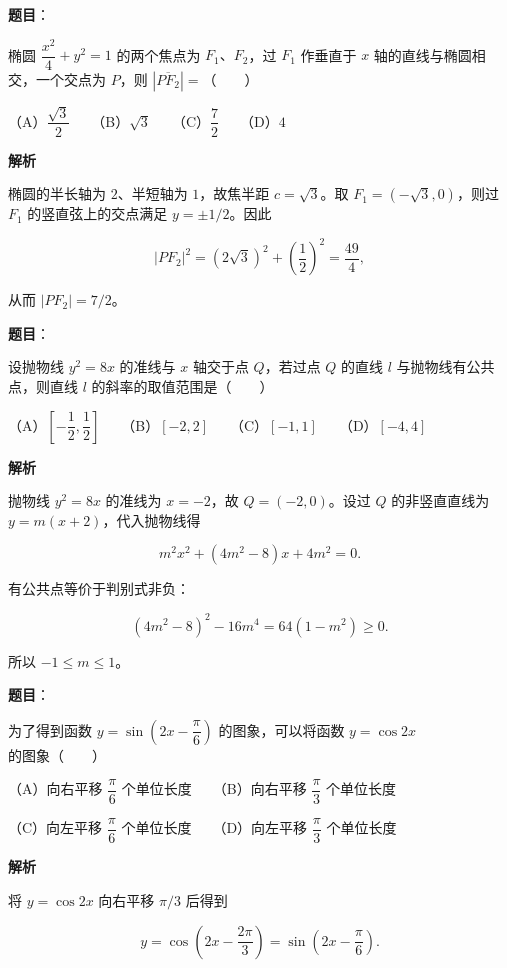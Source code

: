 \begin{answer}

\textbf{题目}：

椭圆 $\dfrac{x^2}{4}+y^2=1$ 的两个焦点为 $F_1\text{、}F_2$，过 $F_1$ 作垂直于 $x$ 轴的直线与椭圆相交，一个交点为 $P$，则 $|\overline{PF_2}|=$\mbox{（　　）}

（A）$\dfrac{\sqrt3}{2}$　　（B）$\sqrt3$　　（C）$\dfrac72$　　（D）$4$

\textbf{解析}

椭圆的半长轴为 $2$、半短轴为 $1$，故焦半距 $c=\sqrt3$。取 $F_1=(-\sqrt3,0)$，则过 $F_1$ 的竖直弦上的交点满足 $y=\pm1/2$。因此

\nopagebreak[4]
\[
|PF_2|^2=(2\sqrt3)^2+\left(\frac12\right)^2=\frac{49}{4},
\]

从而 $|PF_2|=7/2$。


\end{answer}
\begin{answer}

\textbf{题目}：

设抛物线 $y^2=8x$ 的准线与 $x$ 轴交于点 $Q$，若过点 $Q$ 的直线 $l$ 与抛物线有公共点，则直线 $l$ 的斜率的取值范围是\mbox{（　　）}

（A）$\left[-\dfrac12,\dfrac12\right]$　　（B）$[-2,2]$　　（C）$[-1,1]$　　（D）$[-4,4]$

\textbf{解析}

抛物线 $y^2=8x$ 的准线为 $x=-2$，故 $Q=(-2,0)$。设过 $Q$ 的非竖直直线为 $y=m(x+2)$，代入抛物线得

\nopagebreak[4]
\[
m^2x^2+(4m^2-8)x+4m^2=0.
\]

有公共点等价于判别式非负：

\nopagebreak[4]
\[
(4m^2-8)^2-16m^4=64(1-m^2)\geqslant0.
\]

所以 $-1\leqslant m\leqslant1$。


\end{answer}
\begin{answer}

\textbf{题目}：

为了得到函数 $y=\sin\left(2x-\dfrac\pi6\right)$ 的图象，可以将函数 $y=\cos2x$ 的图象\mbox{（　　）}

（A）向右平移 $\dfrac\pi6$ 个单位长度　　（B）向右平移 $\dfrac\pi3$ 个单位长度

（C）向左平移 $\dfrac\pi6$ 个单位长度　　（D）向左平移 $\dfrac\pi3$ 个单位长度

\textbf{解析}

将 $y=\cos2x$ 向右平移 $\pi/3$ 后得到

\nopagebreak[4]
\[
y=\cos\left(2x-\frac{2\pi}{3}\right)
=\sin\left(2x-\frac\pi6\right).
\]


\end{answer}
